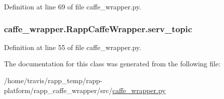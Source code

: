 Definition at line 69 of file caffe\-\_\-wrapper.\-py.

\hypertarget{classcaffe__wrapper_1_1RappCaffeWrapper_ade290e890641a63e9a75abe540dff6d4}{
\subsubsection[{serv\-\_\-topic}]{\setlength{\rightskip}{0pt plus 5cm}caffe\-\_\-wrapper.\-Rapp\-Caffe\-Wrapper.\-serv\-\_\-topic}}\label{classcaffe__wrapper_1_1RappCaffeWrapper_ade290e890641a63e9a75abe540dff6d4}


Definition at line 55 of file caffe\-\_\-wrapper.\-py.



The documentation for this class was generated from the following file\-:\begin{DoxyCompactItemize}
\item 
/home/travis/rapp\-\_\-temp/rapp-\/platform/rapp\-\_\-caffe\-\_\-wrapper/src/\hyperlink{caffe__wrapper_8py}{caffe\-\_\-wrapper.\-py}\end{DoxyCompactItemize}
